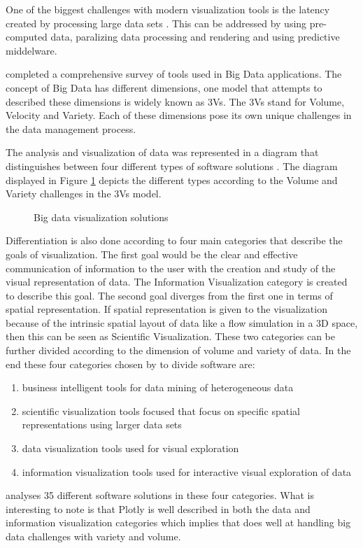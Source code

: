 One of the biggest challenges with modern visualization tools is the latency created by processing large data sets \cite{ali2016big}. This can be addressed by using pre-computed data, paralizing data processing and rendering and using predictive middelware.

\cite{caldarola2017big} completed a comprehensive survey of tools used in Big Data applications. The concept of Big Data has different dimensions, one model that attempts to described these dimensions is widely known as 3Vs. The 3Vs stand for Volume, Velocity and Variety.  Each of these dimensions pose its own unique challenges in the data management process.

The analysis and visualization of data was represented in a diagram that distinguishes between four different types of software solutions \cite{caldarola2017big}. The diagram displayed in Figure \ref{fig:10} depicts the different types according to the Volume and Variety challenges in the 3Vs model. 
\begin{figure}[H]
	\centering{}
	\caption{Big data visualization solutions}\label{fig:10}
\end{figure}
Differentiation is also done according to four main categories that describe the goals of visualization. The first goal would be the clear and effective communication of information to the user with the creation and study of the visual representation of data. The Information Visualization category is created to describe this goal. The second goal diverges from the first one in terms of spatial representation. If spatial representation is given to the visualization because of the intrinsic spatial layout of data like a flow simulation in a 3D space, then this can be seen as Scientific Visualization. These two categories can be further divided according to the dimension of volume and variety of data. In the end these four categories chosen by \cite{caldarola2017big} to divide software are:
\begin{enumerate}
	\item business intelligent tools for data mining of heterogeneous data
	\item scientific visualization tools focused that focus on specific spatial representations using larger data sets
	\item data visualization tools used for visual exploration
	\item information visualization tools used for interactive visual exploration of data
\end{enumerate}
\cite{caldarola2017big} analyses 35 different software solutions in these four categories. What is interesting to note is that Plotly is well described in both the data and information visualization categories which implies that does well at handling big data challenges with variety and volume.





